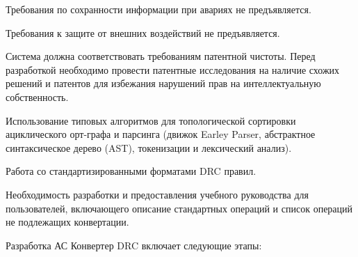 
Требования по сохранности информации при авариях не предъявляется.


Требования к защите от внешних воздействий не предъявляется.


Система должна соответствовать требованиям патентной чистоты.
Перед разработкой необходимо провести патентные исследования
на наличие схожих решений и патентов
для избежания нарушений прав на интеллектуальную собственность.


Использование типовых алгоритмов
для топологической сортировки ациклического орт-графа и парсинга
(движок Earley Parser, абстрактное синтаксическое дерево (AST),
токенизации и лексический анализ).

Работа со стандартизированными форматами DRC правил.


Необходимость разработки и предоставления учебного руководства
для пользователей, включающего описание стандартных операций
и список операций не подлежащих конвертации.


Разработка АС Конвертер DRC включает следующие этапы:

